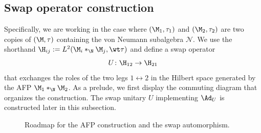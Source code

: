 \documentclass[sn-mathphys-num]{sn-jnl}
\begin{document}
\subsection{Swap operator construction}\label{sec:swap}
Specifically, we are working in the case where $(\M_1,\tau_1)$ and $(\M_2,\tau_2)$ are two copies of $(\M,\tau)$ containing the von Neumann subalgebra $\mathcal N$.
We use the shorthand $\H_{ij}:=L^2(\M_i *_{\N} \M_j,\wt\tau)$ and define a swap operator
\[
U \colon \H_{12} \to \H_{21}
\]
that exchanges the roles of the two legs $1   \leftrightarrow 2$ in the Hilbert space generated by the AFP $\M_1 *_{\N} \M_2$.
As a prelude, we first display the commuting diagram that organizes the construction.
The swap unitary $U$ implementing $\Ad_U$ is constructed later in this subsection.
\begin{figure}[htbp]
    \centering
{}
\caption{Roadmap for the AFP construction and the swap automorphism.}
\label{fig:amalgamated-diagram}
\end{figure}
\end{document}
